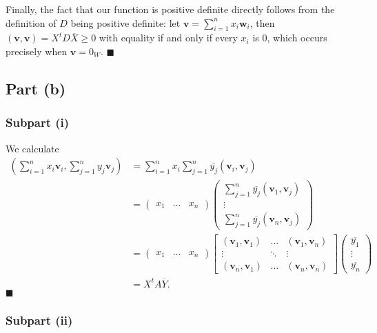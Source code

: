 \documentclass[12pt]{article}
\begin{document}
Finally, the fact that our function is positive definite directly follows from
the definition of $D$ being positive definite: let
$\mathbf{v}=\sum_{i=1}^nx_i\mathbf{w}_i$, then
$(\mathbf{v},\mathbf{v})=X^tD\overline{X}\geq0$
with equality if and only if every $x_i$ is 0, which
occurs precisely when $\mathbf{v}=0_W$.
\hfill$\blacksquare$

\newpage
\subsection*{Part (b)}
\subsubsection*{Subpart (i)}
We calculate
\begin{align*}
    \left(\sum_{i=1}^nx_i\mathbf{v}_i, \sum_{j=1}^ny_j\mathbf{v}_j\right)
    &=\sum_{i=1}^nx_i\sum_{j=1}^n\overline{y_j}(\mathbf{v}_i, \mathbf{v}_j)
    \\&=\begin{pmatrix} x_1&\ldots&x_n \end{pmatrix} 
    \begin{pmatrix}
        \sum_{j=1}^n\overline{y_j}(\mathbf{v}_1, \mathbf{v}_j)\\
        \vdots\\
        \sum_{j=1}^n\overline{y_j}(\mathbf{v}_n, \mathbf{v}_j)
    \end{pmatrix}
    \\&=\begin{pmatrix} x_1&\ldots&x_n \end{pmatrix} 
    \begin{bmatrix} (\mathbf{v}_1,\mathbf{v}_1)
        &\ldots
    &(\mathbf{v}_1,\mathbf{v}_n)
        \\ \vdots&\ddots&\vdots\\
    (\mathbf{v}_n,\mathbf{v}_1)&\ldots&(\mathbf{v}_n,\mathbf{v}_n)
    \end{bmatrix} 
    \begin{pmatrix} \overline{y_1}\\\vdots\\\overline{y_n} \end{pmatrix} 
    \\&= X^t A \overline{Y}
.\end{align*}
\hfill$\blacksquare$

\subsubsection*{Subpart (ii)}
 
\end{document}
